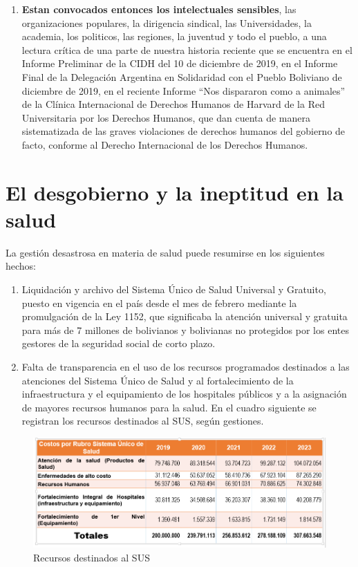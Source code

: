\documentclass[a4paper, nobind]{templates/ociamthesis}
\begin{document}
\begin{enumerate}
\item
  \textbf{Estan convocados entonces los intelectuales sensibles}, las organizaciones populares, la dirigencia sindical, las Universidades, la academia, los politicos, las regiones, la juventud y todo el pueblo, a una lectura crítica de una parte de nuestra historia reciente que se encuentra en el Informe Preliminar de la CIDH del 10 de diciembre de 2019, en el Informe Final de la Delegación Argentina en Solidaridad con el Pueblo Boliviano de diciembre de 2019, en el reciente Informe ``Nos dispararon como a animales'' de la Clínica Internacional de Derechos Humanos de Harvard de la Red Universitaria por los Derechos Humanos, que dan cuenta de manera sistematizada de las graves violaciones de derechos humanos del gobierno de facto, conforme al Derecho Internacional de los Derechos Humanos.
\end{enumerate}

\hypertarget{el-desgobierno-y-la-ineptitud-en-la-salud}{%
\chapter{El desgobierno y la ineptitud en la salud}\label{el-desgobierno-y-la-ineptitud-en-la-salud}}

La gestión desastrosa en materia de salud puede resumirse en los siguientes hechos:

\begin{enumerate}
\def\labelenumi{\arabic{enumi}.}
\item
  Liquidación y archivo del Sistema Único de Salud Universal y Gratuito, puesto en vigencia en el país desde el mes de febrero mediante la promulgación de la Ley 1152, que significaba la atención universal y gratuita para más de 7 millones de bolivianos y bolivianas no protegidos por los entes gestores de la seguridad social de corto plazo.
\item
  Falta de transparencia en el uso de los recursos programados destinados a las atenciones del Sistema Único de Salud y al fortalecimiento de la infraestructura y el equipamiento de los hospitales públicos y a la asignación de mayores recursos humanos para la salud. En el cuadro siguiente se registran los recursos destinados al SUS, según gestiones.
\end{enumerate}

\begin{figure}

{\centering \includegraphics[width=1\linewidth]{figures/tabla-salud} 

}

\caption{Recursos destinados al SUS}\label{fig:unnamed-chunk-1}
\end{figure}
\end{document}
